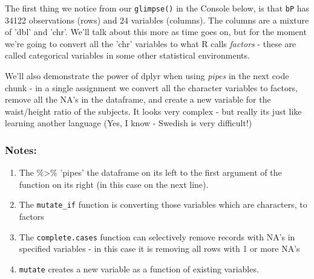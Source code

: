 \documentclass[titlepage]{book}\usepackage{knitr}
\begin{document}
The first thing we notice from our \texttt{glimpse()} in the Console below, is that \texttt{bP} has 34122 observations (rows) and 24 variables (columns). The columns are a mixture of 'dbl' and 'chr'.  We'll talk about this more as time goes on, but for the moment we're going to convert all the 'chr' variables to what R calls \textsl{factors} - these are called categorical variables in some other statistical environments.

We'll also demonstrate the power of dplyr when using \textsl{pipes} in the next code chunk - in a single assignment we convert all the character variables to factors, remove all the NA's in the dataframe, and create a new variable for the waist/height ratio of the subjects. It looks very complex - but really its just like learning another language (Yes, I know - Swedish is very difficult!)
\label{filter}\label{mutate}

\begin{knitrout}
\color{fgcolor}
\end{knitrout}

\subsubsection{Notes:}
\begin{enumerate}
\item{The \%>\%  'pipes' the dataframe on its left to the first argument of the function on its right (in this case on the next line).}
\item{The \texttt{mutate\_if} function is converting those variables which are characters, to factors}
\item{The \texttt{complete.cases} function can selectively remove records with NA's in specified variables - in this case it is removing all rows with 1 or more NA's}
\item{\texttt{mutate} creates a new variable as a function of existing variables.}
\end{enumerate}
\end{document}
